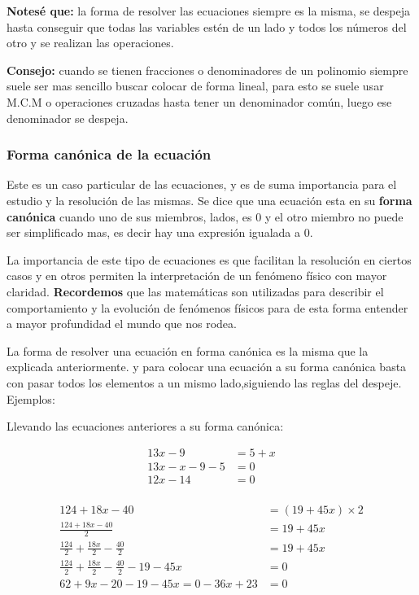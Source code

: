     \textbf{Notesé que: }la forma de resolver las ecuaciones siempre es la misma,
    se despeja hasta conseguir que todas las variables estén de un lado y todos
    los números del otro y se realizan las operaciones.

    \textbf{Consejo: } cuando se tienen fracciones o denominadores de un polinomio
    siempre suele ser mas sencillo buscar colocar de forma lineal, para esto se
    suele usar M.C.M o operaciones cruzadas hasta tener un denominador común,
    luego ese denominador se despeja.


\subsubsection{Forma canónica de la ecuación}
    Este es un caso particular de las ecuaciones, y es de suma importancia para
    el estudio y la resolución de las mismas. Se dice que una ecuación esta en
    su \textbf{forma canónica} cuando uno de sus miembros, lados, es 0 y el otro
    miembro no puede ser simplificado mas, es decir
    hay una expresión igualada a 0.

    La importancia de este tipo de ecuaciones es que facilitan la resolución en
    ciertos casos y en otros permiten la interpretación de un fenómeno físico con
    mayor claridad. \textbf{Recordemos} que las matemáticas son utilizadas para
    describir el comportamiento y la evolución de fenómenos físicos para de esta
    forma entender a mayor profundidad el mundo que nos rodea.

    La forma de resolver una ecuación en forma canónica es la misma que la
    explicada anteriormente. y para colocar una ecuación a su forma canónica basta
    con pasar todos los elementos a un mismo lado,siguiendo las reglas del despeje.
    Ejemplos:

    Llevando las ecuaciones anteriores a su forma canónica:

    \begin{align*}
        13x - 9 &= 5 + x		\\
        13x -x -9 -5 &= 0\\
        12x -14 &= 0 \\
    \end{align*}

    \begin{align*}
        124 + 18x -40 &= (19+45x)\times2 		\\
        \frac{124+18x-40}{2}&= 19 + 45x\\
        \frac{124}{2} +\frac{18x}{2} - \frac{40}{2}  &= 19 +45x\\
        \frac{124}{2} +\frac{18x}{2} - \frac{40}{2} -19 -45x  &=0\\
        62+9x-20-19-45x=0
        -36x+23 &= 0\\
    \end{align*}

